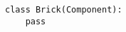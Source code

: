 \par\begin{minipage}{60ex}
\begin{verbatim}
class Brick(Component):
    pass
\end{verbatim}
\end{minipage}\par